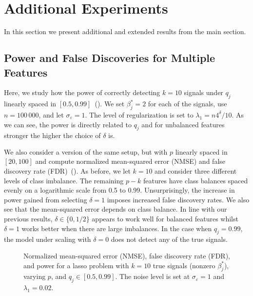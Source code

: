 \section{Additional Experiments}
\label{sec:additional-experiments}

In this section we present additional and extended results from the main section.

\subsection{Power and False Discoveries for Multiple Features}%
\label{sec:power-fdr-multiple}

Here, we study how the power of correctly detecting \(k=10\) signals under \(q_j\) linearly
spaced in \([0.5, 0.99]\)~(). We set \(\beta^*_j = 2\) for each of
the signals, use \(n = 100\,000\), and let \(\sigma_\varepsilon = 1\). The level of
regularization is set to \(\lambda_1 = n 4^\delta/10\). As we can see, the power is
directly related to \(q_j\) and for unbalanced features stronger the higher the choice of
\(\delta\) is.

We also consider a version of the same setup, but with \(p\) linearly spaced in \([20,
    100]\) and compute normalized mean-squared error (NMSE) and false discovery rate
(FDR)~(). As before, we let \(k = 10\) and consider three
different levels of class imbalance. The remaining \(p-k\) features have class balances
spaced evenly on a logarithmic scale from 0.5 to 0.99. Unsurprisingly, the increase in
power gained from selecting \(\delta = 1\) imposes increased false discovery rates. We also
see that the mean-squared error depends on class balance. In line with our previous
results, \(\delta \in \{0, 1/2\}\) appears to work well for balanced features whilst
\(\delta = 1\) works better when there are large imbalances. In the case when \(q_j =
0.99\), the model under scaling with \(\delta = 0\) does not detect any of the true
signals.

\begin{figure}[htpb]
  \centering
  \hfill%
  \caption{%
    Normalized mean-squared error (NMSE), false discovery rate (FDR), and power
    for a lasso problem with \(k = 10\) true signals (nonzero \(\beta_j^*\)),
    varying \(p\), and \(q_j \in [0.5, 0.99]\). The noise level is set at
    \(\sigma_\varepsilon = 1\) and \(\lambda_1 = 0.02\).
  }
\end{figure}

